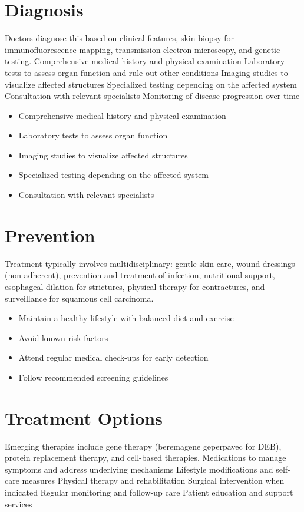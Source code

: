 \section{Diagnosis}
Doctors diagnose this based on clinical features, skin biopsy for immunofluorescence mapping, transmission electron microscopy, and genetic testing. Comprehensive medical history and physical examination Laboratory tests to assess organ function and rule out other conditions Imaging studies to visualize affected structures Specialized testing depending on the affected system Consultation with relevant specialists Monitoring of disease progression over time

\begin{itemize}[noitemsep]
  \item Comprehensive medical history and physical examination
  \item Laboratory tests to assess organ function
  \item Imaging studies to visualize affected structures
  \item Specialized testing depending on the affected system
  \item Consultation with relevant specialists
\end{itemize}
\section{Prevention}
Treatment typically involves multidisciplinary: gentle skin care, wound dressings (non-adherent), prevention and treatment of infection, nutritional support, esophageal dilation for strictures, physical therapy for contractures, and surveillance for squamous cell carcinoma.

\begin{itemize}[noitemsep]
  \item Maintain a healthy lifestyle with balanced diet and exercise
  \item Avoid known risk factors
  \item Attend regular medical check-ups for early detection
  \item Follow recommended screening guidelines
\end{itemize}
\section{Treatment Options}
Emerging therapies include gene therapy (beremagene geperpavec for DEB), protein replacement therapy, and cell-based therapies. Medications to manage symptoms and address underlying mechanisms Lifestyle modifications and self-care measures Physical therapy and rehabilitation Surgical intervention when indicated Regular monitoring and follow-up care Patient education and support services

